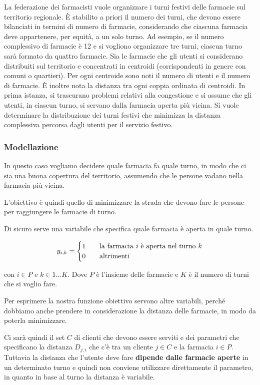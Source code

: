 La federazione dei farmacisti vuole organizzare i turni festivi delle farmacie sul territorio regionale. 
\`E stabilito a priori il numero dei turni, che devono essere bilanciati in termini di numero di farmacie, considerando che ciascuna farmacia deve appartenere, per equità, a un solo turno. 
Ad esempio, se il numero complessivo di farmacie è 12 e si vogliono organizzare tre turni, ciascun turno sarà formato da quattro farmacie. 
Sia le farmacie che gli utenti si considerano distribuiti sul territorio e concentrati in centroidi (corrispondenti in genere con comuni o quartieri). 
Per ogni centroide sono noti il numero di utenti e il numero di farmacie. \`E inoltre nota la distanza tra ogni coppia ordinata di centroidi. 
In prima istanza, si trascurano problemi relativi alla congestione e si assume che gli utenti, in ciascun turno, si servano dalla farmacia aperta più vicina. 
Si vuole determinare la distribuzione dei turni festivi che minimizza la distanza complessiva percorsa dagli utenti per il servizio festivo.

\subsubsection{Modellazione}

In questo caso vogliamo decidere quale farmacia fa quale turno, in modo che ci sia una buona copertura del territorio, assumendo che le persone vadano nella farmacia più vicina.

L'obiettivo è quindi quello di minimizzare la strada che devono fare le persone per raggiungere le farmacie di turno.

Di sicuro serve una variabile che specifica quale farmacia è aperta in quale turno.

$$
y_{i,k} = \begin{cases}
1 \quad &\text{la farmacia \textit{i} è aperta nel turno \textit{k}} \\
0 \quad &\text{altrimenti}
\end{cases}
$$

\noindent con $i \in P$ e $k \in 1 \ldots K$. Dove $P$ è l'insieme delle farmacie e $K$ è il numero di turni che si voglio fare.

Per esprimere la nostra funzione obiettivo servono altre variabili, perché dobbiamo anche prendere in considerazione la distanza delle farmacie, in modo da poterla minimizzare.

Ci sarà quindi il set $C$ di clienti che devono essere serviti e dei parametri che specificano la distanza $D_{j,i}$ che c'è tra un cliente $j \in C$ e la farmacia $i \in P$.
Tuttavia la distanza che l'utente deve fare \textbf{dipende dalle farmacie aperte} in un determinato turno e quindi non conviene utilizzare direttamente il parametro, in quanto in base al turno la distanza è variabile.

